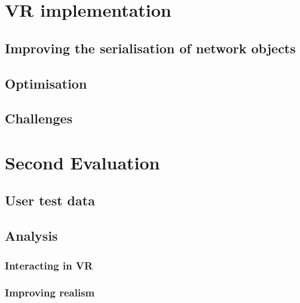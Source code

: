 \section{VR implementation}


\subsection{Improving the serialisation of network objects}



\subsection{Optimisation} \label{subsec:Optimisation}



\subsection{Challenges}


\section{Second Evaluation}

\subsection{User test data}




\subsection{Analysis}


\subsubsection{Interacting in VR}



\subsubsection{Improving realism}




\cleardoublepage
